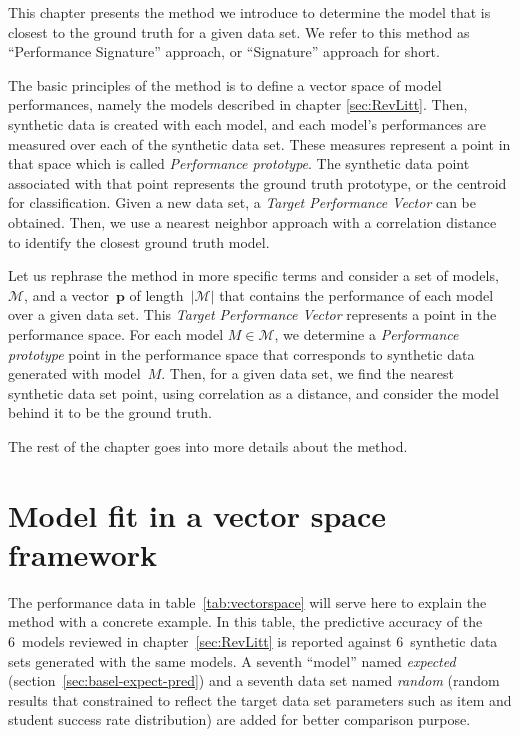 \label{sec:Approach}

This chapter presents the method we introduce to determine the model that is closest to the ground truth for a given data set. We refer to this method as ``Performance Signature'' approach, or ``Signature'' approach for short. 

The basic principles of the method is to define a vector space of model performances, namely the models described in chapter \ref{sec:RevLitt}. Then, synthetic data is created with each model, and each model's performances are measured over each of the synthetic data set. These measures represent a point in that space which is called \textit{Performance prototype}. The synthetic data point associated with that point represents the ground truth prototype, or the centroid for classification. Given a new data set, a \textit{Target Performance Vector} can be obtained. Then, we use a nearest neighbor approach with a correlation distance to identify the closest ground truth model.

Let us rephrase the method in more specific terms and consider a set of models, $\mathcal{M}$, and a vector~$\mathbf{p}$ of length~$|\mathcal{M}|$ that contains the performance of each model over a given data set. This \textit{Target Performance Vector} represents a point in the performance space. For each model $M \in \mathcal{M}$, we determine a \textit{Performance prototype} point in the performance space that corresponds to synthetic data generated with model~$M$. Then, for a given data set, we find the nearest synthetic data set point, using correlation as a distance, and consider the model behind it to be the ground truth.


The rest of the chapter goes into more details about the method.

\section{Model fit in a vector space framework}

The performance data in table~\ref{tab:vectorspace} will serve here to explain the method with a concrete example. In this table, the predictive accuracy of the 6~models reviewed in chapter~\ref{sec:RevLitt} is reported against 6~synthetic data sets generated with the same models. A seventh ``model'' named \textit{expected} (section~\ref{sec:basel-expect-pred}) and a seventh data set named \textit{random} (random results that constrained to reflect the target data set parameters such as item and student success rate distribution) are added for better comparison purpose. 

